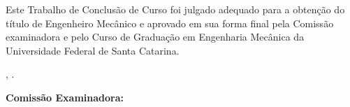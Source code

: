 %
% 
%
\begin{folhadeaprovacao}

  \begin{center}
    {\ABNTEXchapterfont\large\imprimirautor}

    \vspace*{\fill}
    \begin{center}
      \ABNTEXchapterfont\bfseries\Large\imprimirtitulo
    \end{center}
    \vspace*{\fill}
   \end{center}
        
   Este Trabalho de Conclusão de Curso foi julgado adequado para a obtenção do título de Engenheiro Mecânico e aprovado em sua forma final pela Comissão examinadora e pelo Curso de Graduação em Engenharia Mecânica da Universidade Federal de Santa Catarina.

   \imprimirlocal, \imprimirdatacompleta{}.

   \vspace*{\fill}


   \vspace*{\fill}

   \textbf{Comissão Examinadora:}

   \vspace*{\fill}

   \vspace*{\fill}
   \vspace*{\fill}
   \vspace*{\fill}
  
\end{folhadeaprovacao}